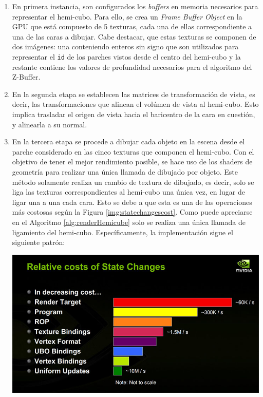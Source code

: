 \begin{enumerate}
	\item En primera instancia, son configurados los \textit{buffers} en memoria necesarios para representar el hemi-cubo.
	Para ello, se crea un \textit{Frame Buffer Object} en la GPU que está compuesto de 5 texturas, cada una de ellas correspondiente a una de las caras a dibujar. Cabe destacar, que estas texturas se componen de dos imágenes: una conteniendo enteros sin signo que son utilizados para representar el \verb|id| de los parches vistos desde el centro del hemi-cubo y la restante contiene los valores de profundidad necesarios para el algoritmo del Z-Buffer.
	\item En la segunda etapa se establecen las matrices de transformación de vista, es decir, las transformaciones que alinean el volúmen de vista al hemi-cubo. Esto implica trasladar el origen de vista hacia el baricentro de la cara en cuestión, y alinearla a su normal.
	\item En la tercera etapa se procede a dibujar cada objeto en la escena desde el parche considerado en las cinco texturas que componen el hemi-cubo. Con el objetivo de tener el mejor rendimiento posible, se hace uso de los shaders de geometría para realizar una única llamada de dibujado por objeto. Este método solamente realiza un cambio de textura de dibujado, es decir, solo se liga las texturas correspondientes al hemi-cubo una única vez, en lugar de ligar una a una cada cara. Esto se debe a que esta es una de las operaciones más costosas según la Figura \ref{img:statechangescost}. Como puede apreciarse en el Algoritmo \ref{alg:renderHemicube} solo se realiza una única llamada de ligamiento del hemi-cubo. Específicamente, la implementación sigue el siguiente patrón:
	
\begin{minipage}[htbp]{\linewidth}
	\centering
	\includegraphics[width=0.6\linewidth]{assets/statecosts}
	\label{img:statechangescost}
\end{minipage}


\end{enumerate}
